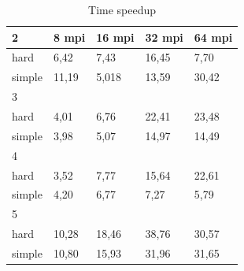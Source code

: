 \documentclass[runningheads]{llncs}
\begin{document}
\begin{table}[!ht]
	\caption{Time speedup}
	\label{tab:2}
	\centering	
	\begin{tabular}{|l|l|l|l|l|}
		\hline
		2 & 8 mpi & 16 mpi & 32 mpi & 64 mpi  \\ \hline
		hard & 6,42 & 7,43 & 16,45 & 7,70  \\ \hline
		simple & 11,19 & 5,018 & 13,59 & 30,42  \\ \hline
		3 & ~ & ~ & ~ &   \\ \hline
		hard & 4,01 & 6,76 & 22,41 & 23,48  \\ \hline
		simple & 3,98 & 5,07 & 14,97 & 14,49  \\ \hline
		4 & ~ & ~ & ~ &   \\ \hline
		hard & 3,52 & 7,77 & 15,64 & 22,61  \\ \hline
		simple & 4,20 & 6,77 & 7,27 & 5,79  \\ \hline
		5 & ~ & ~ & ~ &   \\ \hline
		hard & 10,28 & 18,46 & 38,76 & 30,57  \\ \hline
		simple & 10,80 & 15,93 & 31,96 & 31,65  \\ \hline
	\end{tabular}
\end{table}


\end{document}

